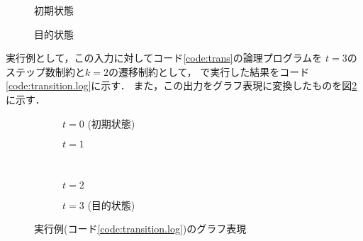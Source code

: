 \begin{figure}[htbp]
 \begin{minipage}{0.4\hsize}
  \centering
  
  \caption{初期状態}
  \label{fig:init}
 \end{minipage}
 \centering
 \hspace{1cm}
 \begin{minipage}{0.4\hsize}
  \centering
  
  \caption{目的状態}
  \label{fig:goal}
 \end{minipage}
\end{figure}


実行例として，この入力に対してコード\ref{code:trans}の論理プログラムを
$t=3$のステップ数制約と$k=2$の遷移制約として，
{\clingo}で実行した結果をコード\ref{code:transition.log}に示す．
また，この出力をグラフ表現に変換したものを図\ref{fig:result-trans}に示す．



\begin{figure}[htbp]
 \centering
 \begin{subfigure}{0.4\hsize}
  \centering
  
  \caption{$t=0$ (初期状態)}
 \end{subfigure}
 \hspace{1cm}
 \begin{subfigure}{0.4\hsize}
  \centering
  
  \caption{$t=1$}
 \end{subfigure}
 \\ \vspace{0.5cm}
 \begin{subfigure}{0.4\hsize}
  \centering
  
  \caption{$t=2$}
 \end{subfigure}
 \hspace{1cm}
 \begin{subfigure}{0.4\hsize}
  \centering
  
  \caption{$t=3$ (目的状態)}
 \end{subfigure}
 \caption{実行例(コード\ref{code:transition.log})のグラフ表現}
 \label{fig:result-trans}
\end{figure}


